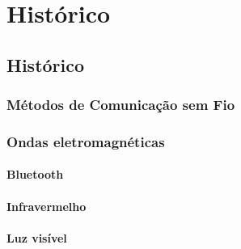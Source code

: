 \part{Histórico}

\chapter[Histórico]{Histórico}

\section{Métodos de Comunicação sem Fio}
\section{Ondas eletromagnéticas}
\subsection{Bluetooth}
\subsection{Infravermelho}
\subsection{Luz visível}

